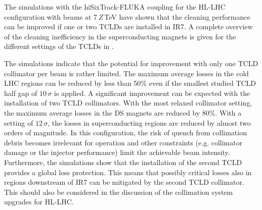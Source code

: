 The simulations with the hiSixTrack-FLUKA coupling for the HL-LHC configuration with \lead beams at 7$\,Z\,$TeV have shown that the cleaning performance can be improved if one or two TCLDs are installed in IR7. A complete overview of the cleaning inefficiency in the superconducting magnets is given for the different settings of the TCLDs in . 
\vspace{0.2cm}



The simulations indicate that the potential for improvement with only one TCLD collimator per beam is rather limited. The maximum average losses in the cold LHC regions can be reduced by less than 50\% even if the smallest studied TCLD half gap of $10\,\sigma$ is applied. A significant improvement can be expected with the installation of two TCLD collimators. With the most relaxed collimator setting, the maximum average losses in the DS magnets are reduced by 80\%. With a setting of $12\,\sigma$, the losses in superconducting regions are reduced by almost two orders of magnitude. In this configuration, the risk of quench from collimation debris becomes irrelevant for operation and other constraints (e.g. collimator damage or the injector performance) limit the achievable beam intensity. Furthermore, the simulations show that the installation of the second TCLD provides a global loss protection. This means that possibly critical losses also in regions downstream of IR7 can be mitigated by the second TCLD collimator. This should also be considered in the discussion of the collimation system upgrades for HL-LHC.
\vspace{0.2cm}

